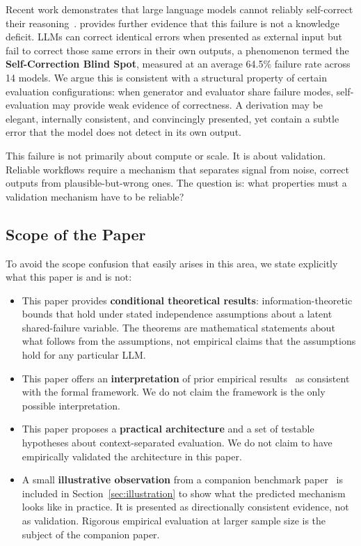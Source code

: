 \documentclass[11pt]{article}
\begin{document}
Recent work demonstrates that large language models cannot reliably self-correct their reasoning~\citep{huang2024selfcorrect}. \citet{tsui2025selfcorrection} provides further evidence that this failure is not a knowledge deficit. LLMs can correct identical errors when presented as external input but fail to correct those same errors in their own outputs, a phenomenon termed the \textbf{Self-Correction Blind Spot}, measured at an average 64.5\% failure rate across 14 models. We argue this is consistent with a structural property of certain evaluation configurations: when generator and evaluator share failure modes, self-evaluation may provide weak evidence of correctness. A derivation may be elegant, internally consistent, and convincingly presented, yet contain a subtle error that the model does not detect in its own output.

This failure is not primarily about compute or scale. It is about validation. Reliable workflows require a mechanism that separates signal from noise, correct outputs from plausible-but-wrong ones. The question is: what properties must a validation mechanism have to be reliable?

\subsection{Scope of the Paper}

To avoid the scope confusion that easily arises in this area, we state explicitly what this paper is and is not:

\begin{itemize}
\item This paper provides \textbf{conditional theoretical results}: information-theoretic bounds that hold under stated independence assumptions about a latent shared-failure variable. The theorems are mathematical statements about what follows from the assumptions, not empirical claims that the assumptions hold for any particular LLM.
\item This paper offers an \textbf{interpretation} of prior empirical results~\citep{huang2024selfcorrect, tsui2025selfcorrection} as consistent with the formal framework. We do not claim the framework is the only possible interpretation.
\item This paper proposes a \textbf{practical architecture} and a set of testable hypotheses about context-separated evaluation. We do not claim to have empirically validated the architecture in this paper.
\item A small \textbf{illustrative observation} from a companion benchmark paper~\citep{brilliant2026benchmark} is included in Section~\ref{sec:illustration} to show what the predicted mechanism looks like in practice. It is presented as directionally consistent evidence, not as validation. Rigorous empirical evaluation at larger sample size is the subject of the companion paper.
\end{itemize}
\end{document}
